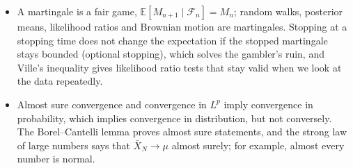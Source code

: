 \documentclass[11pt]{article}
\newcommand{\E}{\mathbb{E}}
\theoremstyle{definition}
\theoremstyle{plain}
\theoremstyle{remark}
\begin{document}
\begin{itemize}[leftmargin=*]
    \item A martingale is a fair game, $\E[M_{n+1} \mid \mathcal{F}_n] = M_n$; random walks, posterior means, likelihood ratios and Brownian motion are martingales. Stopping at a stopping time does not change the expectation if the stopped martingale stays bounded (optional stopping), which solves the gambler's ruin, and Ville's inequality gives likelihood ratio tests that stay valid when we look at the data repeatedly.
    \item Almost sure convergence and convergence in $L^p$ imply convergence in probability, which implies convergence in distribution, but not conversely. The Borel--Cantelli lemma proves almost sure statements, and the strong law of large numbers says that $\bar X_N \to \mu$ almost surely; for example, almost every number is normal.
\end{itemize}
\end{document}

